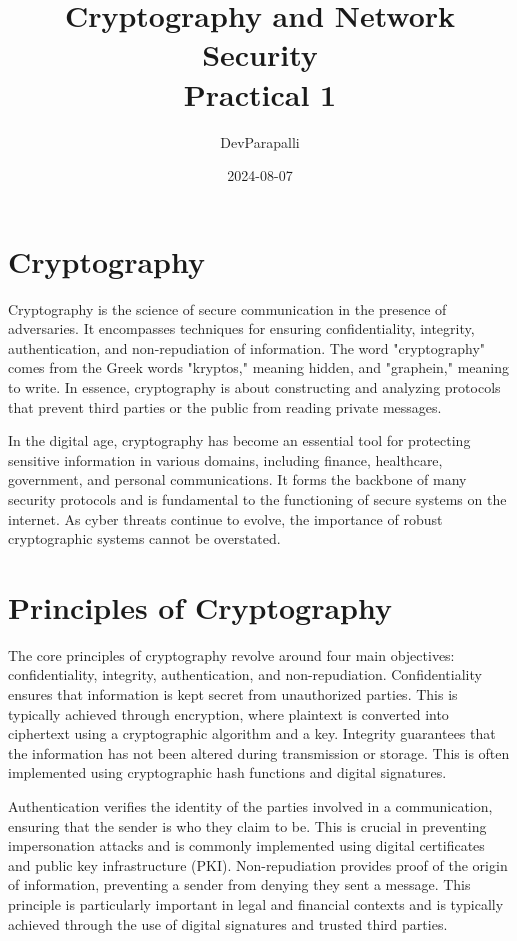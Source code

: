 \documentclass{article}
\title{Cryptography and Network Security\\Practical 1}
\author{DevParapalli}
\date{2024-08-07}
\begin{document}
\maketitle

\section{Cryptography}

Cryptography is the science of secure communication in the presence of adversaries. It encompasses techniques for ensuring confidentiality, integrity, authentication, and non-repudiation of information. The word "cryptography" comes from the Greek words "kryptos," meaning hidden, and "graphein," meaning to write. In essence, cryptography is about constructing and analyzing protocols that prevent third parties or the public from reading private messages.

In the digital age, cryptography has become an essential tool for protecting sensitive information in various domains, including finance, healthcare, government, and personal communications. It forms the backbone of many security protocols and is fundamental to the functioning of secure systems on the internet. As cyber threats continue to evolve, the importance of robust cryptographic systems cannot be overstated.

\section{Principles of Cryptography}

The core principles of cryptography revolve around four main objectives: confidentiality, integrity, authentication, and non-repudiation. Confidentiality ensures that information is kept secret from unauthorized parties. This is typically achieved through encryption, where plaintext is converted into ciphertext using a cryptographic algorithm and a key. Integrity guarantees that the information has not been altered during transmission or storage. This is often implemented using cryptographic hash functions and digital signatures.

Authentication verifies the identity of the parties involved in a communication, ensuring that the sender is who they claim to be. This is crucial in preventing impersonation attacks and is commonly implemented using digital certificates and public key infrastructure (PKI). Non-repudiation provides proof of the origin of information, preventing a sender from denying they sent a message. This principle is particularly important in legal and financial contexts and is typically achieved through the use of digital signatures and trusted third parties.
\end{document}
